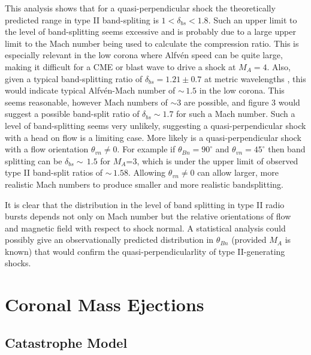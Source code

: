 This analysis shows that for a quasi-perpendicular shock the theoretically predicted range in type II band-spliting is $1<\delta_{bs}<1.8$. Such an upper limit to the level of band-splitting seems excessive and is probably due to a large upper limit to the Mach number being used to calculate the compression ratio. This is especially relevant in the low corona where Alfv\'{e}n speed can be quite large, making it difficult for a CME or blast wave to drive a shock at $M_A=4$. Also, given a typical band-splitting ratio of $\delta_{bs}=1.21\pm0.7$ at metric wavelengths \citep{vrsnak2004}, this would indicate typical Alfv\'{e}n-Mach number of $\sim\,1.5$ in the low corona. This seems reasonable, however Mach numbers of $\sim$3 are possible, and figure 3 would suggest a possible band-split ratio of $\delta_{bs}\sim1.7$ for such a Mach number. Such a level of band-splitting seems very unlikely, suggesting a quasi-perpendicular shock with a head on flow is a limiting case. More likely is a quasi-perpendicular shock with a flow orientation $\theta_{vn}\neq0$. For example if $\theta_{Bn}=90^{\circ}$ and $\theta_{vn}=45^{\circ}$ then band splitting can be $\delta_{bs}\sim\,1.5$ for $M_A$=3, which is under the upper limit of observed type II band-split ratios of $\sim\,1.58$. Allowing $\theta_{vn}\neq0$ can allow larger, more realistic Mach numbers to produce smaller and more realistic bandsplitting.


It is clear that the distribution in the level of band splitting in type II radio bursts depends not only on Mach number but the relative orientations of flow and magnetic field with respect to shock normal. A statistical analysis could possibly give an observationally predicted distribution in $\theta_{Bn}$ (provided $M_A$ is known) that would confirm the quasi-perpendicularlity of type II-generating shocks.




\section{Coronal Mass Ejections}\label{sec:2}

\subsection{Catastrophe Model}\label{sec:20}

